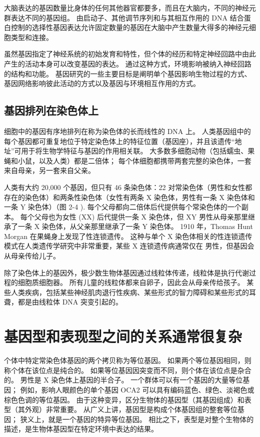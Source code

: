 大脑表达的基因数量比身体的任何其他器官都要多，而且在大脑内，不同的神经元群表达不同的基因组。 
由启动子、其他调节序列和与其相互作用的 DNA 结合蛋白控制的选择性基因表达允许固定数量的基因在大脑中产生数量大得多的神经元细胞类型和连接。


虽然基因指定了神经系统的初始发育和特性，但个体的经历和特定神经回路中由此产生的活动本身可以改变基因的表达。 
通过这种方式，环境影响被纳入神经回路的结构和功能。 
基因研究的一些主要目标是阐明单个基因影响生物过程的方式、基因网络影响彼此活动的方式以及基因与环境相互作用的方式。



\subsection{基因排列在染色体上}

细胞中的基因有序地排列在称为染色体的长而线性的 DNA 上。 
人类基因组中的每个基因都可重复地位于特定染色体上的特征位置（基因座），并且该遗传“地址”可用于将生物学特征与基因的作用相关联。 
大多数多细胞动物（包括蠕虫、果蝇和小鼠，以及人类）都是二倍体； 
每个体细胞都携带两套完整的染色体，一套来自母亲，另一套来自父亲。


人类有大约 20,000 个基因，但只有 46 条染色体：22 对常染色体（男性和女性都存在的染色体）和两条性染色体（女性有两条 X 染色体，男性有一条 X 染色体和一条 Y 染色体）（图 2-4 ). 每个父母都向二倍体后代提供每个常染色体的一个副本。 
每个父母也为女性 (XX) 后代提供一条 X 染色体，但 XY 男性从母亲那里继承了一条 X 染色体，从父亲那里继承了一条 Y 染色体。 
1910 年，Thomas Hunt Morgan 在果蝇身上发现了性连锁遗传。
这种与单个 X 染色体相关的性连锁遗传模式在人类遗传学研究中非常重要，某些 X 连锁遗传病通常仅在 男性，但基因会从母亲传给儿子。


除了染色体上的基因外，极少数生物体基因通过线粒体传递，线粒体是执行代谢过程的细胞质细胞器。 
所有儿童的线粒体都来自卵子，因此会从母亲传给孩子。 某些人类疾病，包括某些神经肌肉退行性疾病、某些形式的智力障碍和某些形式的耳聋，都是由线粒体 DNA 突变引起的。


\section{基因型和表现型之间的关系通常很复杂}

个体中特定常染色体基因的两个拷贝称为等位基因。 
如果两个等位基因相同，则称个体在该位点是纯合的。 
如果等位基因因突变而不同，则个体在该位点是杂合的。 男性是 X 染色体上基因的半合子。 
一个群体可以有一个基因的大量等位基因； 
例如，影响人眼颜色的单个基因 OCA2 可以具有编码蓝色、绿色、淡褐色或棕色色调的等位基因。 
由于这种变异，区分生物体的基因型（其基因组成）和表型（其外观）非常重要。 
从广义上讲，基因型是构成个体基因组的整套等位基因； 狭义上，就是一个基因的特异等位基因。 
相比之下，表型是对整个生物体的描述，是生物体基因型在特定环境中表达的结果。

